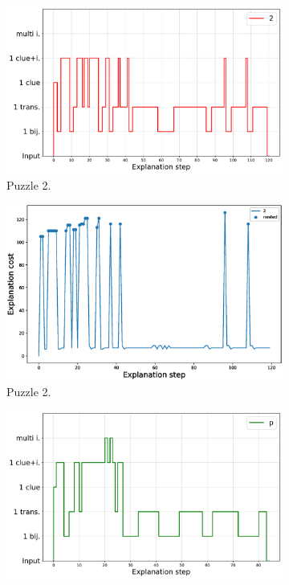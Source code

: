 \begin{figure}[t!]
\begin{subfigure}{.5\textwidth}
				\includegraphics[width=0.9\linewidth]{figures/plot_cost_steps_2.pdf}
				\caption{Puzzle 2.}
				\label{fig:composition_puzzle:p2}
		\end{subfigure}%
		\begin{subfigure}{.5\textwidth}
				\centering
				\includegraphics[width=0.84\linewidth]{figures/2.eps}
				\caption{Puzzle 2.}
				\label{fig:cost_puzzle:p2}
		\end{subfigure}
		\begin{subfigure}{.5\textwidth}
				\centering
				\includegraphics[width=0.9\linewidth]{figures/plot_cost_steps_p.pdf}

\end{subfigure}
\end{figure}
